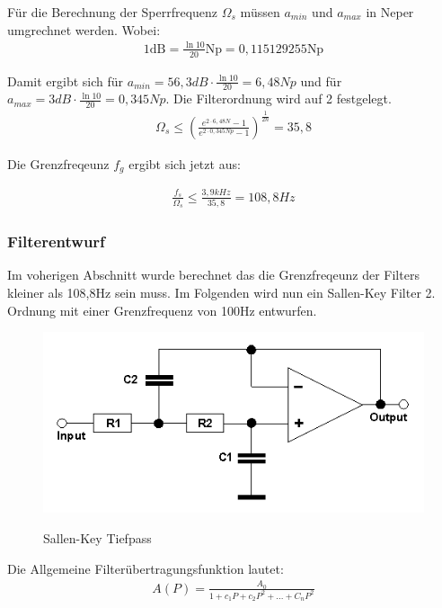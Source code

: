 \documentclass[11pt,twoside,openright]{mpreport}
\begin{document}
Für die Berechnung der Sperrfrequenz $\Omega_s$ müssen  $a_{min}$ und $a_{max}$ in Neper umgrechnet werden. Wobei:
\begin{align*}
1 \text{dB} =  \frac{\ln{10}}{20}\text{Np} = 0,115129255 \text{Np}   
\end{align*}

Damit ergibt sich für $a_{min}=56,3 dB\cdot \frac{\ln{10}}{20}=6,48Np$ und für  $a_{max}=3 dB\cdot \frac{\ln{10}}{20}=0,345Np$. Die Filterordnung wird auf 2 festgelegt.
\begin{align}
\Omega_s \le  \left(\frac{e^{2\cdot6,48N }-1}{e^{2\cdot 0,345Np}-1}\right)^{\frac{1}{2n}}  = 35,8
\end{align}

Die Grenzfreqeunz $f_g$ ergibt sich jetzt aus:

\begin{align}
\frac{f_s}{\Omega_s} \le \frac{3,9kHz}{35,8} = 108,8Hz
\end{align}

\subsubsection{Filterentwurf}
Im voherigen Abschnitt wurde berechnet das die Grenzfreqeunz der Filters kleiner als 108,8Hz sein muss.
Im Folgenden wird nun ein Sallen-Key Filter 2. Ordnung mit einer Grenzfrequenz von 100Hz entwurfen.

\begin{figure}[H]
\centering
\includegraphics[scale=0.8]{tiefpass_sk.png}\\
\caption{Sallen-Key Tiefpass}%
\label{fig:tiefpass_sk}
\end{figure}
Die Allgemeine Filterübertragungsfunktion lautet:
\begin{align}
A(P)=\frac{A_0}{1+c_1P+c_2P^2+...+C_nP^2}
\label{eq:pass_alg}
\end{align}
\end{document}
